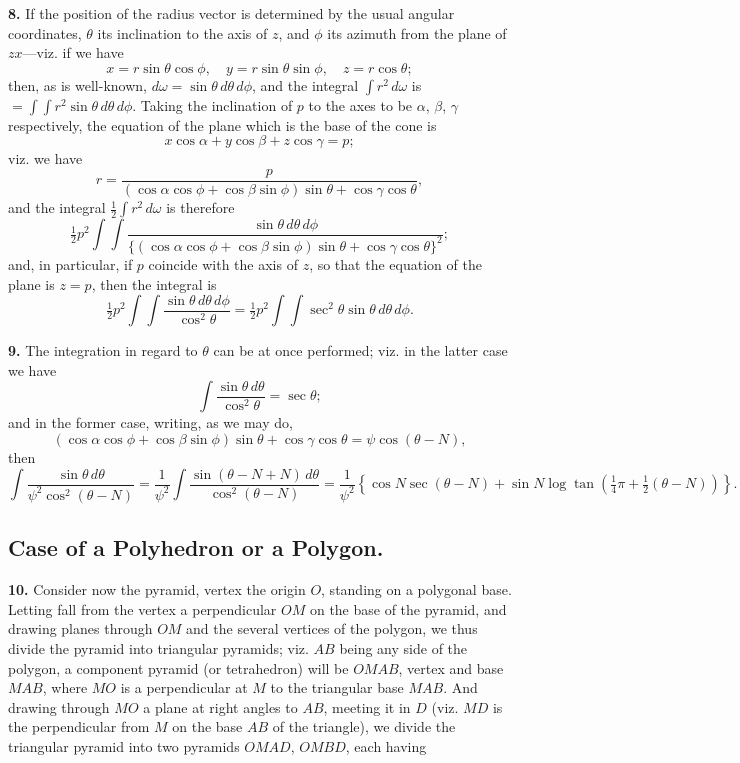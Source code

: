 \documentclass[11pt,a4paper]{book}
\begin{document}
\smallskip\noindent\textbf{8.}\quad
If the position of the radius vector is determined by the usual angular
coordinates, $\theta$ its inclination to the axis of $z$, and $\phi$ its
azimuth from the plane of $zx$---viz. if we have
\[
x = r\sin\theta\cos\phi, \quad
y = r\sin\theta\sin\phi, \quad
z = r\cos\theta;
\]
then, as is well-known, $d\omega = \sin\theta\,d\theta\,d\phi$, and the
integral $\int r^2\,d\omega$ is $= \int\!\!\int r^2\sin\theta\,d\theta\,d\phi$.
Taking the inclination of $p$ to the axes to be $\alpha$, $\beta$, $\gamma$
respectively, the equation of the plane which is the base of the cone is
\[
x\cos\alpha + y\cos\beta + z\cos\gamma = p;
\]
viz. we have
\[
r = \frac{p}{(\cos\alpha\cos\phi + \cos\beta\sin\phi)\sin\theta + \cos\gamma\cos\theta},
\]
and the integral $\tfrac{1}{2}\int r^2\,d\omega$ is therefore
\[
\tfrac{1}{2}p^2 \int\!\!\int
  \frac{\sin\theta\,d\theta\,d\phi}
       {\{ (\cos\alpha\cos\phi + \cos\beta\sin\phi)\sin\theta
          + \cos\gamma\cos\theta \}^2};
\]
and, in particular, if $p$ coincide with the axis of $z$, so that the
equation of the plane is $z=p$, then the integral is
\[
\tfrac{1}{2}p^2 \int\!\!\int \frac{\sin\theta\,d\theta\,d\phi}{\cos^2\theta}
  = \tfrac{1}{2}p^2 \int\!\!\int \sec^2\theta \sin\theta\,d\theta\,d\phi.
\]

\newpage
\noindent\textbf{9.}\quad
The integration in regard to $\theta$ can be at once performed; viz. in the
latter case we have
\[
\int \frac{\sin\theta\,d\theta}{\cos^2\theta} = \sec\theta;
\]
and in the former case, writing, as we may do,
\[
(\cos\alpha\cos\phi + \cos\beta\sin\phi)\sin\theta + \cos\gamma\cos\theta
= \psi\cos(\theta-N),
\]
then
\[
\int \frac{\sin\theta\,d\theta}{\psi^2\cos^2(\theta-N)}
= \frac{1}{\psi^2}
  \int \frac{\sin(\theta-N+N)\,d\theta}{\cos^2(\theta-N)}
= \frac{1}{\psi^2}
  \left\{
    \cos N \sec(\theta-N) + \sin N \log\tan\left(\tfrac{1}{4}\pi + \tfrac{1}{2}(\theta-N)\right)
  \right\}.
\]

\subsection*{Case of a Polyhedron or a Polygon.}

\smallskip\noindent\textbf{10.}\quad
Consider now the pyramid, vertex the origin $O$, standing on a polygonal
base. Letting fall from the vertex a perpendicular $OM$ on the base of the
pyramid, and drawing planes through $OM$ and the several vertices of the
polygon, we thus divide the pyramid into triangular pyramids; viz. $AB$ being
any side of the polygon, a component pyramid (or tetrahedron) will be $OMAB$,
vertex and base $MAB$, where $MO$ is a perpendicular at $M$ to the triangular
base $MAB$. And drawing through $MO$ a plane at right angles to $AB$, meeting
it in $D$ (viz. $MD$ is the perpendicular from $M$ on the base $AB$ of the
triangle), we divide the triangular pyramid into two pyramids $OMAD$, $OMBD$,
each having
\end{document}
